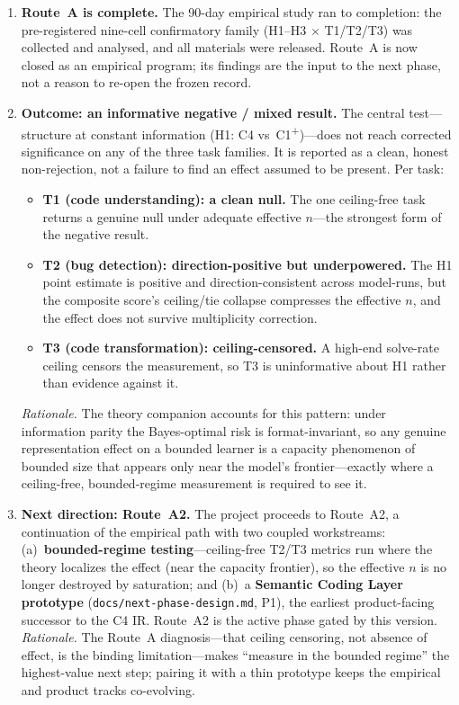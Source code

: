 \documentclass[11pt]{article}
\begin{document}
\begin{enumerate}
  \item \textbf{Route~A is complete.} The 90-day empirical study ran to
    completion: the pre-registered nine-cell confirmatory family
    (H1--H3 $\times$ T1/T2/T3) was collected and analysed, and all
    materials were released. Route~A is now closed as an empirical
    program; its findings are the input to the next phase, not a reason
    to re-open the frozen record.

  \item \textbf{Outcome: an informative negative / mixed result.} The
    central test---structure at constant information (H1: C4 vs\
    C1\textsuperscript{+})---does not reach corrected significance on any
    of the three task families. It is reported as a clean, honest
    non-rejection, not a failure to find an effect assumed to be present.
    Per task:
    \begin{itemize}[nosep]
      \item \textbf{T1 (code understanding): a clean null.} The one
        ceiling-free task returns a genuine null under adequate effective
        $n$---the strongest form of the negative result.
      \item \textbf{T2 (bug detection): direction-positive but
        underpowered.} The H1 point estimate is positive and
        direction-consistent across model-runs, but the composite score's
        ceiling/tie collapse compresses the effective $n$, and the effect
        does not survive multiplicity correction.
      \item \textbf{T3 (code transformation): ceiling-censored.} A
        high-end solve-rate ceiling censors the measurement, so T3 is
        uninformative about H1 rather than evidence against it.
    \end{itemize}
    \emph{Rationale.} The theory companion accounts for this pattern:
    under information parity the Bayes-optimal risk is format-invariant,
    so any genuine representation effect on a bounded learner is a
    capacity phenomenon of bounded size that appears only near the
    model's frontier---exactly where a ceiling-free, bounded-regime
    measurement is required to see it.

  \item \textbf{Next direction: Route~A2.} The project proceeds to
    Route~A2, a continuation of the empirical path with two coupled
    workstreams: (a)~\textbf{bounded-regime testing}---ceiling-free T2/T3
    metrics run where the theory localizes the effect (near the capacity
    frontier), so the effective $n$ is no longer destroyed by
    saturation; and (b)~a \textbf{Semantic Coding Layer prototype}
    (\texttt{docs/next-phase-design.md}, P1), the earliest product-facing
    successor to the C4 IR. Route~A2 is the active phase gated by this
    version.
    \emph{Rationale.} The Route~A diagnosis---that ceiling censoring, not
    absence of effect, is the binding limitation---makes ``measure in the
    bounded regime'' the highest-value next step; pairing it with a thin
    prototype keeps the empirical and product tracks co-evolving.


\end{enumerate}
\end{document}
